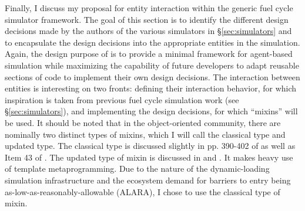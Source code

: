 Finally, I discuss my proposal for entity interaction within the generic fuel
cycle simulator framework. The goal of this section is to identify the different
design decisions made by the authors of the various simulators in
\S\ref{sec:simulators} and to encapsulate the design decisions into the
appropriate entities in the \Cyclus simulation. Again, the design purpose of
\Cyclus is to provide a minimal framework for agent-based simulation while
maximizing the capability of future developers to adapt reusable sections of
code to implement their own design decisions. The interaction between entities
is interesting on two fronts: defining their interaction behavior, for which
inspiration is taken from previous fuel cycle simulation work (see
\S\ref{sec:simulators}), and implementing the design decisions, for which
``mixins'' will be used. It should be noted that in the object-oriented
community, there are nominally two distinct types of mixins, which I will call
the classical type and updated type. The classical type is discussed slightly in
pp. 390-402 of \cite{stroustrup_c++_2000} as well as Item 43 of
\cite{meyers_effective_2005}. The updated type of mixin is discussed in
\cite{ulrich_mixin-based_2001} and \cite{smaragdakis_mixin_2002}. It makes heavy
use of template metaprogramming. Due to the nature of the \Cyclus
dynamic-loading simulation infrastructure and the \Cyclus ecosystem demand for
barriers to entry being as-low-as-reasonably-allowable (ALARA), I chose to use
the classical type of mixin.
